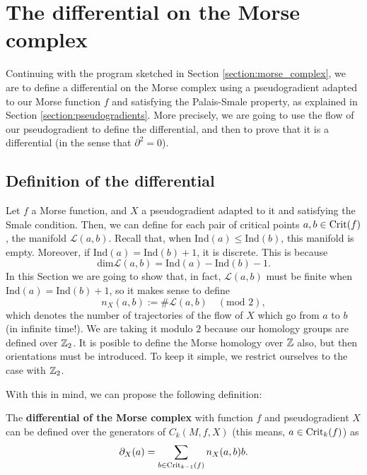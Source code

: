 \section{The differential on the Morse complex} \label{section:morse_differential}

Continuing with the program sketched in Section \ref{section:morse_complex}, we are to define a differential on the Morse complex using a pseudogradient adapted to our Morse function $f$ and satisfying the Palais-Smale property, as explained in Section \ref{section:pseudogradients}. More precisely, we are going to use the flow of our pseudogradient to define the differential, and then to prove that it is a differential (in the sense that $\partial^2 = 0$).

\subsection{Definition of the differential}

Let $f$ a Morse function, and $X$ a pseudogradient adapted to it and satisfying the Smale condition. Then, we can define for each pair of critical points $a, b \in \mathrm{Crit}(f)$, the manifold $\mathcal{L}(a,b)$. Recall that, when $\text{Ind}(a) \leq \text{Ind}(b)$, this manifold is empty. Moreover, if $\text{Ind}(a) = \text{Ind}(b) + 1$, it is discrete. This is because
\[\text{dim} \mathcal{L}(a,b) = \text{Ind}(a) - \text{Ind}(b) - 1 .\]
In this Section we are going to show that, in fact, $\mathcal{L}(a,b)$ must be finite when $\text{Ind}(a) = \text{Ind}(b) + 1$, so it makes sense to define
\[n_X(a,b) := \# \mathcal{L}(a,b) \quad (\text{mod } 2),\]
which denotes the number of trajectories of the flow of $X$ which go from $a$ to $b$ (in infinite time!). We are taking it modulo $2$ because our homology groups are defined over $\mathbb{Z}_2$. It is posible to define the Morse homology over $\mathbb{Z}$ also, but then orientations must be introduced. To keep it simple, we restrict ourselves to the case with $\mathbb{Z}_2$.

With this in mind, we can propose the following definition:

\begin{deff}
The {\bf differential of the Morse complex} with function $f$ and pseudogradient $X$ can be defined over the generators of $C_k(M,f,X)$ (this means, $a \in \mathrm{Crit}_k(f)$) as
\begin{displaymath}
\partial_X (a) = \sum_{b \in \mathrm{Crit}_{k-1}(f)} n_X(a,b) b .
\end{displaymath}
\end{deff}

